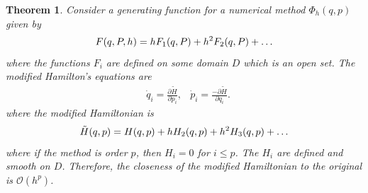 \documentclass{report}
\newtheorem{theorem}{Theorem}[chapter]
\theoremstyle{exampstyle} \newtheorem{example}[theorem]{Example}
\theoremstyle{exampstyle} \newtheorem{remark}[theorem]{Remark}
\theoremstyle{exampstyle} \newtheorem{definition}[theorem]{Definition}
\theoremstyle{exampstyle} \newtheorem{lemma}[theorem]{Lemma}
\theoremstyle{exampstyle} \newtheorem{proposition}[theorem]{Proposition}
\begin{document}
\begin{theorem}{\cite{gni2006, Casas_2016}}
Consider a generating function for a numerical method $\Phi_h(q,p)$ given by
\begin{equation}
	F(q,P,h) = h F_1(q,P) + h^2 F_2(q,P) + \mathellipsis
	\label{eqn:methodgen}
\end{equation}
where the functions $F_i$ are defined on some domain $D$ which is an open set.
The modified Hamilton's equations are 
\begin{align*}
	&\dot{q}_i = \frac{\partial \tilde{H}}{\partial p_i}, &\dot{p}_i = \frac{- \partial \tilde{H}}{\partial q_i}.
\end{align*}
where the modified Hamiltonian is
\begin{equation}
	\tilde{H}(q,p) = H(q,p) + h H_2(q,p) + h^2 H_3(q,p) + \mathellipsis
	\label{eqn:powerham}	
\end{equation}
where if the method is order $p$, then $H_i = 0$ for $i \leq p$.
The $H_i$ are defined and smooth on $D$.
Therefore, the closeness of the modified Hamiltonian to the original is $\mathcal{O}(h^p)$.
\end{theorem}
\end{document}
